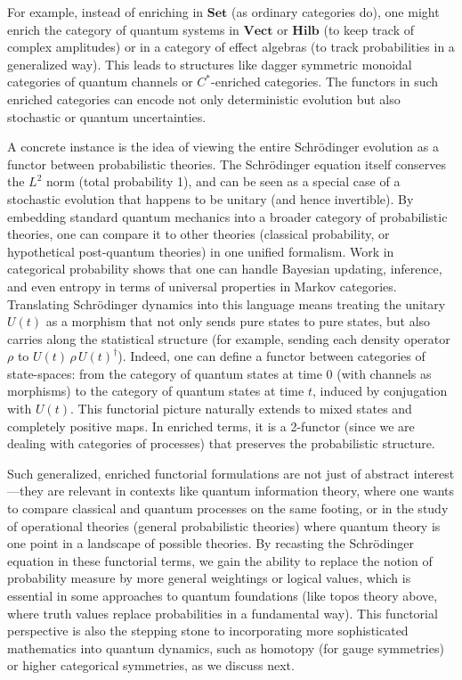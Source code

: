 \documentclass[12pt]{article}
\begin{document}
For example, instead of enriching in $\mathbf{Set}$ (as ordinary categories do), one might enrich the category of quantum systems in $\mathbf{Vect}$ or $\mathbf{Hilb}$ (to keep track of complex amplitudes) or in a category of effect algebras (to track probabilities in a generalized way). This leads to structures like dagger symmetric monoidal categories of quantum channels or $C^*$-enriched categories. The functors in such enriched categories can encode not only deterministic evolution but also stochastic or quantum uncertainties.

A concrete instance is the idea of viewing the entire Schrödinger evolution as a functor between probabilistic theories. The Schrödinger equation itself conserves the $L^2$ norm (total probability 1), and can be seen as a special case of a stochastic evolution that happens to be unitary (and hence invertible). By embedding standard quantum mechanics into a broader category of probabilistic theories, one can compare it to other theories (classical probability, or hypothetical post-quantum theories) in one unified formalism. Work in categorical probability shows that one can handle Bayesian updating, inference, and even entropy in terms of universal properties in Markov categories. Translating Schrödinger dynamics into this language means treating the unitary $U(t)$ as a morphism that not only sends pure states to pure states, but also carries along the statistical structure (for example, sending each density operator $\rho$ to $U(t)\,\rho\,U(t)^\dagger$). Indeed, one can define a functor between categories of state-spaces: from the category of quantum states at time $0$ (with channels as morphisms) to the category of quantum states at time $t$, induced by conjugation with $U(t)$. This functorial picture naturally extends to mixed states and completely positive maps. In enriched terms, it is a 2-functor (since we are dealing with categories of processes) that preserves the probabilistic structure.

Such generalized, enriched functorial formulations are not just of abstract interest---they are relevant in contexts like quantum information theory, where one wants to compare classical and quantum processes on the same footing, or in the study of operational theories (general probabilistic theories) where quantum theory is one point in a landscape of possible theories. By recasting the Schrödinger equation in these functorial terms, we gain the ability to replace the notion of probability measure by more general weightings or logical values, which is essential in some approaches to quantum foundations (like topos theory above, where truth values replace probabilities in a fundamental way). This functorial perspective is also the stepping stone to incorporating more sophisticated mathematics into quantum dynamics, such as homotopy (for gauge symmetries) or higher categorical symmetries, as we discuss next.
\end{document}
